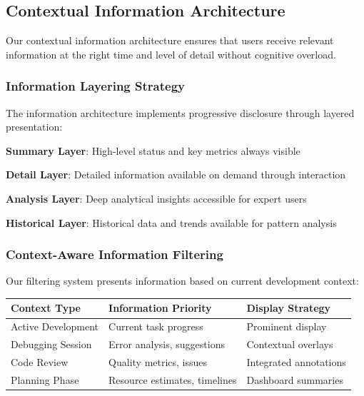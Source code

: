 \subsection*{Contextual Information Architecture}

Our contextual information architecture ensures that users receive relevant information at the right time and level of detail without cognitive overload.

\subsubsection*{Information Layering Strategy}

The information architecture implements progressive disclosure through layered presentation:

\begin{expandedlist}
    \item \textbf{Summary Layer}: High-level status and key metrics always visible
    \item \textbf{Detail Layer}: Detailed information available on demand through interaction
    \item \textbf{Analysis Layer}: Deep analytical insights accessible for expert users
    \item \textbf{Historical Layer}: Historical data and trends available for pattern analysis
\end{expandedlist}

\subsubsection*{Context-Aware Information Filtering}

Our filtering system presents information based on current development context:

\begin{center}
\begin{tabular}{@{}lll@{}}
\toprule
\textbf{Context Type} & \textbf{Information Priority} & \textbf{Display Strategy} \\
\midrule
Active Development & Current task progress & Prominent display \\
Debugging Session & Error analysis, suggestions & Contextual overlays \\
Code Review & Quality metrics, issues & Integrated annotations \\
Planning Phase & Resource estimates, timelines & Dashboard summaries \\
\bottomrule
\end{tabular}
\end{center}

